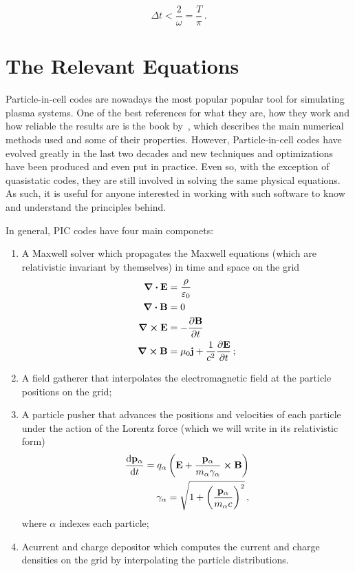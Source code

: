 \documentclass[12pt, class=report, crop=false]{standalone}
\begin{document}
\begin{equation}
  \Delta t < \frac{2}{\omega} = \frac{T}{\pi}\,.
\end{equation}

\section{The Relevant Equations}

Particle-in-cell codes are nowadays the most popular popular tool for simulating plasma systems. One of the best references for what they are, how they work and how reliable the results are is the book by~\cite{birdsallPlasmaPhysicsComputer1995}, which describes the main numerical methods used and some of their properties. However, Particle-in-cell codes have evolved greatly in the last two decades and new techniques and optimizations have been produced and even put in practice. Even so, with the exception of quasistatic codes, they are still involved in solving the same physical equations. As such, it is useful for anyone interested in working with such software to know and understand the principles behind.

In general, PIC codes have four main componets:
\begin{enumerate}
  \item A Maxwell solver which propagates the Maxwell equations (which are relativistic invariant by themselves) in time and space on the grid
  \begin{subequations}
    \begin{align}
    \div{\vb{E}} & = \frac{\rho}{\varepsilon_0} \\
    \div{\vb{B}} & = 0 \\
    \curl{\vb{E}} & = - \pdv{\vb{B}}{t} \\
    \curl{\vb{B}} & = \mu_0 \vb{j} + \frac{1}{c^2} \pdv{\vb{E}}{t} \,;
    \end{align}
  \end{subequations}
  \item A field gatherer that interpolates the electromagnetic field at the particle positions on the grid;
  \item A particle pusher that advances the positions and velocities of each particle under the action of the Lorentz force (which we will write in its relativistic form)
  \begin{subequations}
    \begin{align}
      \label{eq:NL}
      \dv{\vb{p_\alpha}}{t} = q_\alpha \left(\vb{E}+\frac{\vb{p_\alpha}}{m_\alpha \gamma_\alpha} \cp \vb{B} \right)\\
      \gamma_\alpha = \sqrt{1+\left(\frac{\vb{p_\alpha}}{m_\alpha c}\right)^2}\,,
    \end{align}
  \end{subequations}
  where \(\alpha\) indexes each particle;
  \item Acurrent and charge depositor which computes the current and charge densities on the grid by interpolating the particle distributions.
\end{enumerate}
\end{document}
